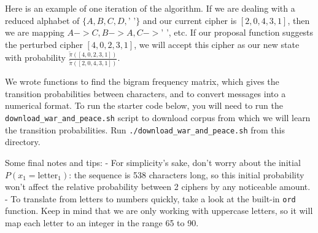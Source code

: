 \documentclass[11pt]{article}
\begin{document}
Here is an example of one iteration of the algorithm. If we are dealing
with a reduced alphabet of \(\{A,B,C,D,\text{' '}\}\) and our current
cipher is \([ 2,0,4,3,1 ]\), then we are mapping
\(A->C, B->A, C->\text{' '}\), etc. If our proposal function suggests
the perturbed cipher \([ 4,0,2,3,1 ]\), we will accept this cipher as
our new state with probability
\(\frac{\widetilde{\pi}([ 4,0,2,3,1 ])}{\widetilde{\pi}([ 2,0,4,3,1 ])}\).

We wrote functions to find the bigram frequency matrix, which gives the
transition probabilities between characters, and to convert messages
into a numerical format. To run the starter code below, you will need to
run the \texttt{download\_war\_and\_peace.sh} script to download corpus
from which we will learn the transition probabilities. Run
\texttt{./download\_war\_and\_peace.sh} from this directory.

Some final notes and tips: - For simplicity's sake, don't worry about
the initial \(P(x_1 = \text{letter}_1)\): the sequence is 538 characters
long, so this initial probability won't affect the relative probability
between 2 ciphers by any noticeable amount. - To translate from letters
to numbers quickly, take a look at the built-in \texttt{ord} function.
Keep in mind that we are only working with uppercase letters, so it will
map each letter to an integer in the range 65 to 90.
\end{document}
